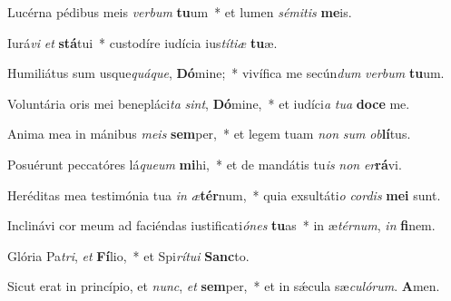 \item Lucérna pédibus meis \textit{ver}\textit{bum} \textbf{tu}um~* et lumen \textit{sé}\textit{mi}\textit{tis} \textbf{me}is.

\item Iurá\textit{vi} \textit{et} \textbf{stá}tui~* custodíre iudícia ius\textit{tí}\textit{ti}\textit{æ} \textbf{tu}æ.

\item Humiliátus sum usque\textit{quá}\textit{que}, \textbf{Dó}mine;~* vivífica me secún\textit{dum} \textit{ver}\textit{bum} \textbf{tu}um.

\item Voluntária oris mei benepláci\textit{ta} \textit{sint}, \textbf{Dó}mine,~* et iudíci\textit{a} \textit{tu}\textit{a} \textbf{do}\textbf{ce} me.

\item Anima mea in mánibus \textit{me}\textit{is} \textbf{sem}per,~* et legem tuam \textit{non} \textit{sum} \textit{ob}\textbf{lí}tus.

\item Posuérunt peccatóres lá\textit{que}\textit{um} \textbf{mi}hi,~* et de mandátis tu\textit{is} \textit{non} \textit{er}\textbf{rá}vi.

\item Heréditas mea testimónia tua \textit{in} \textit{æ}\textbf{tér}num,~* quia exsultáti\textit{o} \textit{cor}\textit{dis} \textbf{me}\textbf{i} sunt.

\item Inclinávi cor meum ad faciéndas iustificati\textit{ó}\textit{nes} \textbf{tu}as~* in æ\textit{tér}\textit{num}, \textit{in} \textbf{fi}nem.

\item Glória Pa\textit{tri}, \textit{et} \textbf{Fí}lio,~* et Spi\textit{rí}\textit{tu}\textit{i} \textbf{Sanc}to.

\item Sicut erat in princípio, et \textit{nunc}, \textit{et} \textbf{sem}per,~* et in sǽcula sæ\textit{cu}\textit{ló}\textit{rum}. \textbf{A}men.
